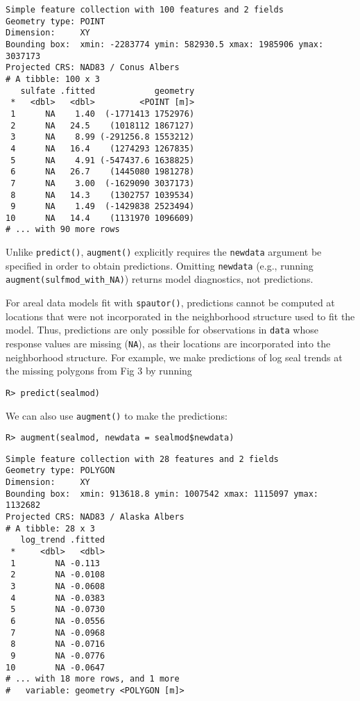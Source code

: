 \documentclass[10pt,letterpaper]{article}
\begin{document}
\begin{verbatim}
Simple feature collection with 100 features and 2 fields
Geometry type: POINT
Dimension:     XY
Bounding box:  xmin: -2283774 ymin: 582930.5 xmax: 1985906 ymax: 3037173
Projected CRS: NAD83 / Conus Albers
# A tibble: 100 x 3
   sulfate .fitted            geometry
 *   <dbl>   <dbl>         <POINT [m]>
 1      NA    1.40  (-1771413 1752976)
 2      NA   24.5    (1018112 1867127)
 3      NA    8.99 (-291256.8 1553212)
 4      NA   16.4    (1274293 1267835)
 5      NA    4.91 (-547437.6 1638825)
 6      NA   26.7    (1445080 1981278)
 7      NA    3.00  (-1629090 3037173)
 8      NA   14.3    (1302757 1039534)
 9      NA    1.49  (-1429838 2523494)
10      NA   14.4    (1131970 1096609)
# ... with 90 more rows
\end{verbatim}

Unlike \texttt{predict()}, \texttt{augment()} explicitly requires the
\texttt{newdata} argument be specified in order to obtain predictions.
Omitting \texttt{newdata} (e.g., running
\texttt{augment(sulfmod\_with\_NA)}) returns model diagnostics, not
predictions.

For areal data models fit with \texttt{spautor()}, predictions cannot be
computed at locations that were not incorporated in the neighborhood
structure used to fit the model. Thus, predictions are only possible for
observations in \texttt{data} whose response values are missing
(\texttt{NA}), as their locations are incorporated into the neighborhood
structure. For example, we make predictions of log seal trends at the
missing polygons from Fig 3 by running

\begin{verbatim}
R> predict(sealmod)
\end{verbatim}

We can also use \texttt{augment()} to make the predictions:

\begin{verbatim}
R> augment(sealmod, newdata = sealmod$newdata)
\end{verbatim}

\begin{verbatim}
Simple feature collection with 28 features and 2 fields
Geometry type: POLYGON
Dimension:     XY
Bounding box:  xmin: 913618.8 ymin: 1007542 xmax: 1115097 ymax: 1132682
Projected CRS: NAD83 / Alaska Albers
# A tibble: 28 x 3
   log_trend .fitted
 *     <dbl>   <dbl>
 1        NA -0.113 
 2        NA -0.0108
 3        NA -0.0608
 4        NA -0.0383
 5        NA -0.0730
 6        NA -0.0556
 7        NA -0.0968
 8        NA -0.0716
 9        NA -0.0776
10        NA -0.0647
# ... with 18 more rows, and 1 more
#   variable: geometry <POLYGON [m]>
\end{verbatim}
\end{document}
